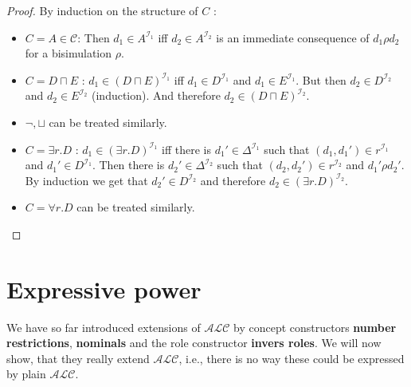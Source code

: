 
\begin{proof}
	By induction on the structure of $C$ :
	\begin{itemize}
		\item $C = A \in \mathscr{C}$:
			Then $d_1 \in A^{\mathcal{I}_1}$ iff $d_2 \in A^{\mathcal{I}_2}$ is an immediate consequence of $d_1 \rho d_2$ for a bisimulation $\rho$.
		\item $C = D \sqcap E$ :
			$d_1 \in \left( D \sqcap E \right)^{\mathcal{I}_1}$ iff $d_1 \in D^{\mathcal{I}_1}$ and $d_1 \in E^{\mathcal{I}_1}$.
			But then $d_2 \in D^{\mathcal{I}_2}$ and $d_2 \in E^{\mathcal{I}_2}$ (induction).
			And therefore $d_2 \in \left( D \sqcap E \right)^{\mathcal{I}_2}$.
		\item $\neg, \sqcup$ can be treated similarly.
		\item $C = \exists r.D$ :
				$d_1 \in \left( \exists r.D \right)^{\mathcal{I}_1}$ iff there is $d_1' \in \Delta^{\mathcal{I}_1}$ such that $(d_1, d_1') \in r^{\mathcal{I}_1}$ and $d_1' \in D^{\mathcal{I}_1}$.
				Then there is $d_2' \in \Delta^{\mathcal{I}_2}$ such that $\left( d_2, d_2' \right) \in r^{\mathcal{I}_2}$ and $d_1' \rho d_2'$.
				By induction we get that $d_2' \in D^{\mathcal{I}_2}$ and therefore  $d_2 \in \left( \exists r.D \right)^{\mathcal{I}_2}$.
			\item $C = \forall r.D$ can be treated similarly.
			\qedhere
	\end{itemize}
\end{proof}

\newpage
\section{Expressive power}
We have so far introduced extensions of $\mathcal{ALC}$ by concept constructors \textbf{number restrictions}, \textbf{nominals} and the role constructor \textbf{invers roles}.
We will now show, that they really extend $\mathcal{ALC}$, i.e., there is no way these could be expressed by plain $\mathcal{ALC}$.

